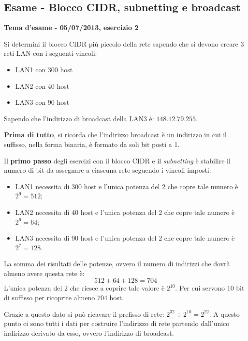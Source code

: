 \documentclass[a4paper]{article}
\begin{document}
	\subsection{\textcolor{Red3}{Esame - Blocco CIDR, subnetting e broadcast}}
	
	\begin{center}
		\large
		\textcolor{Green4}{\textbf{Tema d'esame - 05/07/2013, esercizio 2}}
	\end{center}
	
	\noindent
	Si determini il blocco CIDR più piccolo della rete sapendo che si devono creare 3 reti LAN con i seguenti vincoli:
	\begin{itemize}
		\item LAN1 con 300 host
		\item LAN2 con 40 host
		\item LAN3 con 90 host
	\end{itemize}
	Sapendo che l'indirizzo di broadcast della LAN3 è: $148.12.79.255$.\newline
	
	\noindent
	\textbf{Prima di tutto}, si ricorda che l’indirizzo broadcast è un indirizzo in cui il suffisso, nella forma binaria, è formato da soli bit posti a 1.\newline
	
	\noindent
	Il \textbf{primo passo} degli esercizi con il blocco CIDR e il \emph{subnetting} è stabilire il numero di bit da assegnare a ciascuna rete seguendo i vincoli imposti:
	\begin{itemize}
		\item LAN1 necessita di 300 host e l'unica potenza del 2 che copre tale numero è $2^{9} = 512$;
		\item LAN2 necessita di 40 host e l'unica potenza del 2 che copre tale numero è $2^{6} = 64$;
		\item LAN3 necessita di 90 host e l'unica potenza del 2 che copre tale numero è $2^{7} = 128$.
	\end{itemize}
	La somma dei risultati delle potenze, ovvero il numero di indirizzi che dovrà almeno avere questa rete è:
	\begin{equation*}
		512 + 64 + 128 = 704
	\end{equation*}
	L'unica potenza del 2 che riesce a coprire tale valore è $2^{10}$. Per cui servono 10 bit di suffisso per ricoprire almeno 704 host.\newline
	
	\noindent
	Grazie a questo dato si può ricavare il prefisso di rete: $2^{32} \div 2^{10}=2^{22}$. A questo punto ci sono tutti i dati per costruire l’indirizzo di rete partendo dall’unico indirizzo derivato da esso, ovvero l’indirizzo di broadcast.\newline
	
\end{document}
